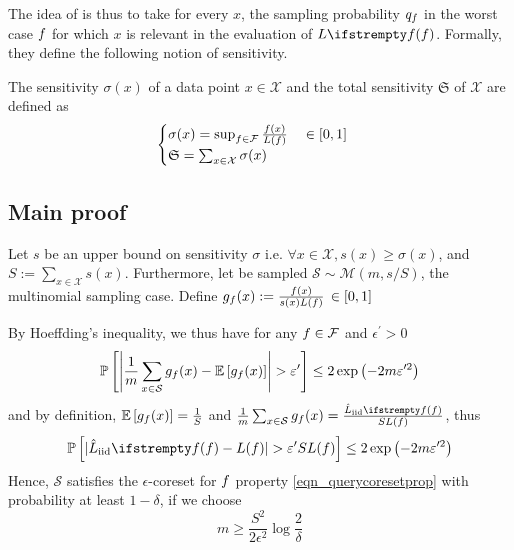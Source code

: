 The idea of \cite{langberg2010_universal_approximator} is thus to take for every $x$, the sampling probability $q_f$ in the worst case $f$ for which $x$ is relevant in the evaluation of $\loss{\query}$. Formally, they define the following notion of sensitivity.

\begin{definition}[Sensitivity]
	The sensitivity $\sigma(x)$ of a data point $x \in \mathcal{X}$ and the total sensitivity $\mathfrak S$ of $\mathcal X$ are defined as
	\begin{align*}
        \begin{cases}
            \sigma(x) = \sup _{f \in \mathcal{F}} \frac{{f}\left(x\right)}{L(f)} \quad \in[0,1]\\
            \mathfrak{S}=\sum_{x\in \mathcal{X}} \sigma(x)
        \end{cases}
    \end{align*}
\end{definition} 

\subsection{Main proof}
Let $s$ be an upper bound on sensitivity $\sigma$ i.e. $\forall x \in \mathcal{X}, s(x) \geq \sigma(x)$, and $S := \sum_{x\in \mathcal{X}} s(x)$. Furthermore, let be sampled  $\mathcal S \sim \mathcal M(m, s/S)$, the multinomial sampling case. Define $g_f(x) :=  \frac{f(x)}{s(x) L(f)}  \, \in[0,1]$

By Hoeffding's inequality, we thus have for any $f \in \mathcal{F}$ and $\epsilon^{\prime}>0$
\begin{equation}
	\mathbb{P}\left[\left|\frac{1}{m} \sum_{x \in \mathcal{S}} g_{\query}(x) - \mathbb{E}\left[g_{\query}(x)\right]\right|>\epsilon^{\prime}\right] \leq 2 \exp \left(-2 m \epsilon^{\prime 2}\right)
\end{equation}
and by definition, $\mathbb{E}\left[g_{f}(x)\right]=\frac{1}{S}$ and $\frac{1}{m} \sum_{x \in \mathcal{S}} g_{\query}(x)=\frac{\estloss{\textrm{iid}}{\query}}{S L(\query)}$, thus
\begin{equation*}
	\mathbb{P}\left[|\estloss{\textrm{iid}}{\query} - L(\query)|>\epsilon^{\prime} S L(\query)\right] \leq 2 \exp \left(-2 m \epsilon^{\prime 2}\right)
\end{equation*}
Hence, $\mathcal{S}$ satisfies the $\epsilon$-coreset for $f$ property \ref{eqn_querycoresetprop} with probability at least $1-\delta$, if we choose
\begin{equation}
	m \geq \frac{S^{2}}{2 \epsilon^{2}} \log \frac{2}{\delta}
\end{equation}


